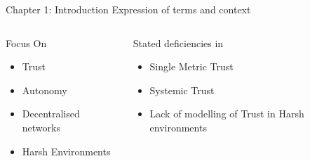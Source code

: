 \documentclass[aspectratio=169]{beamer}
\begin{document}
\begin{frame}{Chapter 1: Introduction}
  Expression of terms and context
  \begin{columns}
    \begin{column}{0.5\textwidth}
      \begin{block}{Focus On}
        \begin{itemize}
          \item Trust
          \item Autonomy
          \item Decentralised networks
          \item Harsh Environments
        \end{itemize}
      \end{block}
    \end{column}
    \begin{column}{0.5\textwidth}
      \begin{alertblock}{Stated deficiencies in}
        \begin{itemize}
          \item Single Metric Trust
          \item Systemic Trust
          \item Lack of modelling of Trust in Harsh environments
        \end{itemize}
      \end{alertblock}
    \end{column}
  \end{columns}
\end{frame}
\end{document}

